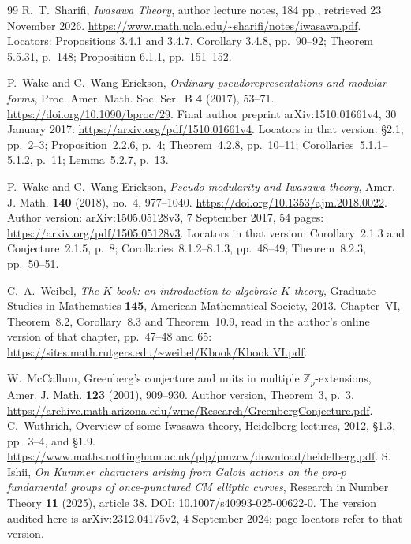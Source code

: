 \documentclass[11pt]{article}
\theoremstyle{definition}\newtheorem{definition}[theorem]{Definition}
\newcommand{\Z}{\mathbb Z}\newcommand{\Q}{\mathbb Q}
\begin{document}
\begin{thebibliography}{99}
R.~T.~Sharifi, \emph{Iwasawa Theory}, author lecture notes, 184 pp.,
retrieved 23 November 2026.
\url{https://www.math.ucla.edu/~sharifi/notes/iwasawa.pdf}.
Locators: Propositions 3.4.1 and 3.4.7, Corollary 3.4.8, pp.~90--92;
Theorem 5.5.31, p.~148; Proposition 6.1.1, pp.~151--152.

P.~Wake and C.~Wang-Erickson,
\emph{Ordinary pseudorepresentations and modular forms},
Proc. Amer. Math. Soc. Ser.~B \textbf{4} (2017), 53--71.
\url{https://doi.org/10.1090/bproc/29}.
Final author preprint arXiv:1510.01661v4, 30 January 2017:
\url{https://arxiv.org/pdf/1510.01661v4}.
Locators in that version: \S2.1, pp.~2--3;
Proposition~2.2.6, p.~4; Theorem~4.2.8, pp.~10--11;
Corollaries~5.1.1--5.1.2, p.~11; Lemma~5.2.7, p.~13.

P.~Wake and C.~Wang-Erickson,
\emph{Pseudo-modularity and Iwasawa theory},
Amer. J. Math. \textbf{140} (2018), no.~4, 977--1040.
\url{https://doi.org/10.1353/ajm.2018.0022}.
Author version: arXiv:1505.05128v3,
7 September 2017, 54 pages:
\url{https://arxiv.org/pdf/1505.05128v3}.
Locators in that version: Corollary~2.1.3 and Conjecture~2.1.5, p.~8;
Corollaries~8.1.2--8.1.3, pp.~48--49;
Theorem~8.2.3, pp.~50--51.

C.~A.~Weibel, \emph{The $K$-book: an introduction to algebraic $K$-theory},
Graduate Studies in Mathematics \textbf{145}, American Mathematical Society, 2013.
Chapter~VI, Theorem~8.2, Corollary~8.3 and Theorem~10.9, read in the author's online version of that chapter,
pp.~47--48 and 65: \url{https://sites.math.rutgers.edu/~weibel/Kbook/Kbook.VI.pdf}.

W.~McCallum, Greenberg's conjecture and units in multiple $\Z_p$-extensions, Amer. J. Math. \textbf{123} (2001), 909--930. Author version, Theorem~3, p.~3. \url{https://archive.math.arizona.edu/wmc/Research/GreenbergConjecture.pdf}.
C.~Wuthrich, Overview of some Iwasawa theory, Heidelberg lectures, 2012, \S1.3, pp.~3--4, and \S1.9. \url{https://www.maths.nottingham.ac.uk/plp/pmzcw/download/heidelberg.pdf}.
S. Ishii, \emph{On Kummer characters arising from Galois actions on
the pro-\(p\) fundamental groups of once-punctured CM elliptic curves},
Research in Number Theory \textbf{11} (2025), article 38.
DOI: 10.1007/s40993-025-00622-0.
The version audited here is arXiv:2312.04175v2, 4 September 2024;
page locators refer to that version.



\end{thebibliography}
\end{document}
